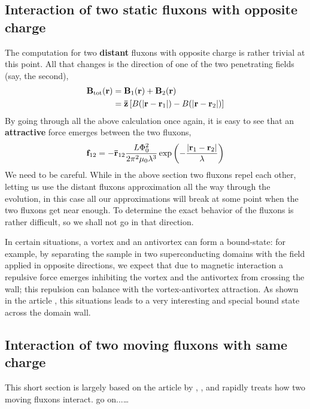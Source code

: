 \subsection{Interaction of two static fluxons with opposite charge}

The computation for two \textbf{distant} fluxons with opposite charge is rather trivial at this point. All that changes is the direction of one of the two penetrating fields (say, the second),
\[
\begin{aligned}
	\mathbf{B}_\mathrm{tot}(\mathbf{r}) &= \mathbf{B}_1(\mathbf{r}) + \mathbf{B}_2(\mathbf{r}) \\
	&= \mathbf{\bar{z}} \left[{B(\abs{\mathbf{r}-\mathbf{r}_1})-B(\abs{\mathbf{r}-\mathbf{r}_2})}\right]
\end{aligned}
\]
By going through all the above calculation once again, it is easy to see that an \textbf{attractive} force emerges between the two fluxons,
\[
	\mathbf{f}_{12} = -\mathbf{\bar{r}}_{12} \frac{L \Phi_0^2}{2\pi^2\mu_0 \lambda^3} \exp \left({- \frac{\abs{\mathbf{r}_1-\mathbf{r}_2}}{\lambda} }\right)
\]
We need to be careful. While in the above section two fluxons repel each other, letting us use the distant fluxons approximation all the way through the evolution, in this case all our approximations will break at some point when the two fluxons get near enough. To determine the exact behavior of the fluxons is rather difficult, so we shall not go in that direction.

In certain situations, a vortex and an antivortex can form a bound-state: for example, by separating the sample in two superconducting domains with the field applied in opposite directions, we expect that due to magnetic interaction a repulsive force emerges inhibiting the vortex and the antivortex from crossing the wall; this repulsion can balance with the vortex-antivortex attraction. As shown in the article  \cite{Simmendinger_2020}, this situations leads to a very interesting and special bound state across the domain wall.

\subsection{Interaction of two moving fluxons with same charge}

This short section is largely based on the article by \citeauthor{PhysRevB.102.024506},  \cite{PhysRevB.102.024506}, and rapidly treats how two moving fluxons interact. {\color{red}go on...\dots}

